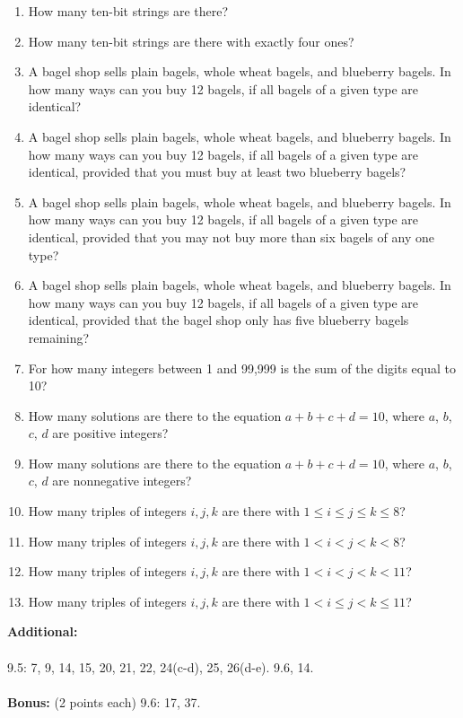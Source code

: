 \documentclass[12pt]{amsart}
\begin{document}
\begin{enumerate}[(1.)]
\item
How many ten-bit strings are there?
\item
How many ten-bit strings are there with exactly four ones?
\item
A bagel shop sells plain bagels, whole wheat bagels, and blueberry bagels. In how many ways can you buy
12 bagels, if all bagels of a given type are identical?
\item
A bagel shop sells plain bagels, whole wheat bagels, and blueberry bagels. In how many ways can you buy
12 bagels, if all bagels of a given type are identical, provided that you must buy at least two blueberry bagels?
\item
A bagel shop sells plain bagels, whole wheat bagels, and blueberry bagels. In how many ways can you buy
12 bagels, if all bagels of a given type are identical, provided that you may not buy more than six bagels of any
one type?
\item
A bagel shop sells plain bagels, whole wheat bagels, and blueberry bagels. In how many ways can you buy
12 bagels, if all bagels of a given type are identical, provided that the bagel shop only has five blueberry bagels
remaining?
\item
For how many integers between 1 and 99,999 is the sum of the digits equal to 10?
\item
How many solutions are there to the equation $a + b + c + d = 10$, where $a$, $b$, $c$, $d$ are positive integers?
\item
How many solutions are there to the equation $a + b + c + d = 10$, where $a$, $b$, $c$, $d$ are nonnegative integers?
\item
How many triples of integers $i, j, k$ are there with $1 \leq i \leq j \leq k \leq 8$?
\item
How many triples of integers $i, j, k$ are there with $1 < i < j < k < 8$?
\item
How many triples of integers $i, j, k$ are there with $1 < i < j < k < 11$?
\item
How many triples of integers $i, j, k$ are there with $1 < i \leq j < k \leq 11$?
\end{enumerate}
{\bf Additional:}
\\
\\
9.5: 7, 9, 14, 15, 20, 21, 22, 24(c-d), 25, 26(d-e). 9.6, 14.
\\
\\
{\bf Bonus:} (2 points each) 9.6: 17, 37.
\end{document}

